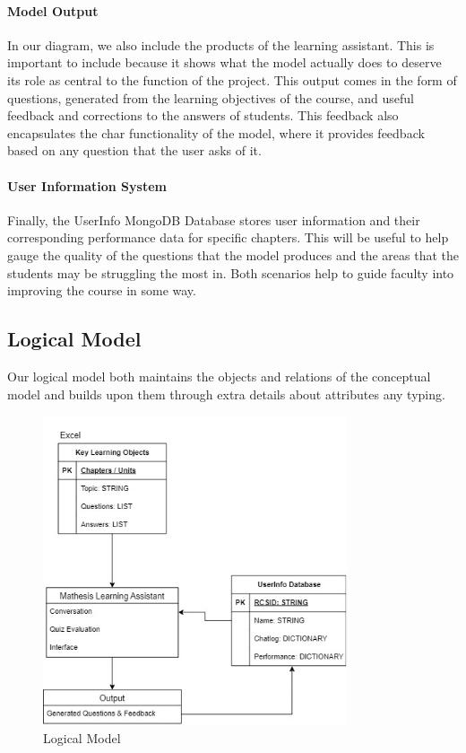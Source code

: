 \documentclass[12pt,a4paper]{article}
\begin{document}
    \paragraph{Model Output}
    In our diagram, we also include the products of the learning assistant.  This is important to include
    because it shows what the model actually does to deserve its role as central to the function of
    the project.  This output comes in the form of questions, generated from the learning objectives
    of the course, and useful feedback and corrections to the answers of students.  This feedback also
    encapsulates the char functionality of the model, where it provides feedback based on any question
    that the user asks of it.

    \paragraph{User Information System}
    Finally, the UserInfo MongoDB Database stores user information and their corresponding performance
    data for specific chapters.  This will be useful to help gauge the quality of the questions that
    the model produces and the areas that the students may be struggling the most in.  Both scenarios
    help to guide faculty into improving the course in some way.

    
    \subsection{Logical Model}
    
    Our logical model both maintains the objects and relations of the conceptual model and builds upon
    them through extra details about attributes any typing.

    \begin{figure}[H]
        \centering
        \includegraphics[width=0.8\textwidth]{Logical_diagram}
        \caption{Logical Model}
        \label{fig:logicalModel}
    \end{figure}
\end{document}
